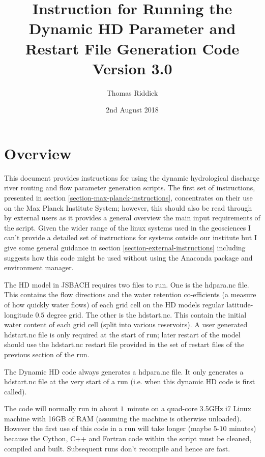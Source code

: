 \documentclass{article}
\title{Instruction for Running the Dynamic HD Parameter and Restart File Generation Code Version 3.0}
\author{Thomas Riddick}
\date{2nd August 2018}
\begin{document}
\lstset{language=bash}
\maketitle
\section{Overview}
This document provides instructions for using the dynamic hydrological discharge river routing and flow parameter generation scripts. The first set of instructions, presented in section \ref{section-max-planck-instructions}, concentrates on their use on the Max Planck Institute System; however, this should also be read through by external users as it provides a general overview the main input requirements of the script. Given the wider range of the linux systems used in the geosciences I can't provide a detailed set of instructions for systems outside our institute but I give some general guidance in section \ref{section-external-instructions} including suggests how this code might be used without using the Anaconda package and environment manager.

The HD model in JSBACH requires two files to run. One is the hdpara.nc file. This contains the flow directions and the water retention co-efficients (a measure of how quickly water flows) of each grid cell on the HD models regular latitude-longitude $0.5$ degree grid. The other is the hdstart.nc. This contain the initial water content of each grid cell (split into various reservoirs). A user generated hdstart.nc file is only required at the start of run; later restart of the model should use the hdstart.nc restart file provided in the set of restart files of the previous section of the run.

The Dynamic HD code always generates a hdpara.nc file. It only generates a hdstart.nc file at the very start of a run (i.e. when this dynamic HD code is first called).

The code will normally run in about $1$~minute on a quad-core  3.5GHz i7 Linux machine with 16GB of RAM (assuming the machine is otherwise unloaded). However the first use of this code in a run will take longer (maybe $5$-$10$ minutes) because the Cython, C++ and Fortran code within the script must be cleaned, compiled and built. Subsequent runs don't recompile and hence are fast.
\end{document}
